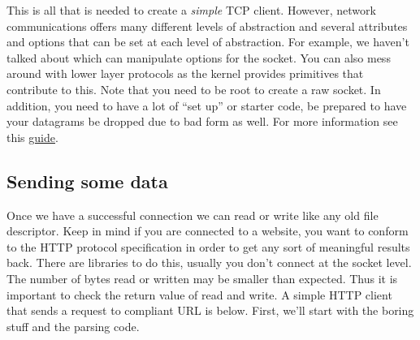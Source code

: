 This is all that is needed to create a \textit{simple} TCP client. However, network communications offers many different levels of abstraction and several attributes and options that can be set at each level of abstraction.
For example, we haven't talked about  which can manipulate options for the socket.
You can also mess around with lower layer protocols as the kernel provides primitives that contribute to this.
Note that you need to be root to create a raw socket.
In addition, you need to have a lot of ``set up'' or starter code, be prepared to have your datagrams be dropped due to bad form as well.
For more information see this \href{http://www.beej.us/guide/bgnet/output/html/multipage/getaddrinfoman.html}{guide}.

\subsection{Sending some data}

Once we have a successful connection we can read or write like any old file descriptor.
Keep in mind if you are connected to a website, you want to conform to the HTTP protocol specification in order to get any sort of meaningful results back.
There are libraries to do this, usually you don't connect at the socket level.
The number of bytes read or written may be smaller than expected.
Thus it is important to check the return value of read and write.
A simple HTTP client that sends a request to compliant URL is below.
First, we'll start with the boring stuff and the parsing code.

